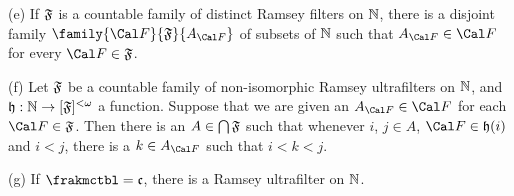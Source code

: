 (e) If $\frak F$ is a countable family of distinct Ramsey filters on
$\Bbb N$, there is a disjoint family $\family{\Cal F}{\frak F}{A_{\Cal F}}$
of subsets of $\Bbb N$ such that $A_{\Cal F}\in\Cal F$ for every
$\Cal F\in\frak F$.

(f) Let $\frak F$ be a countable
family of non-isomorphic Ramsey ultrafilters on $\Bbb N$, and
$\frak h:\Bbb N\to[\frak F]^{<\omega}$ a function.
Suppose that we are given
an $A_{\Cal F}\in\Cal F$ for each $\Cal F\in\frak F$.
Then there is an $A\in\bigcap\frak F$ such that whenever $i$, $j\in A$,
$\Cal F\in\frak h(i)$ and $i<j$, there is a $k\in A_{\Cal F}$ such that
$i<k<j$.

(g) If $\frakmctbl=\frak c$, there is a Ramsey ultrafilter on $\Bbb N$.


